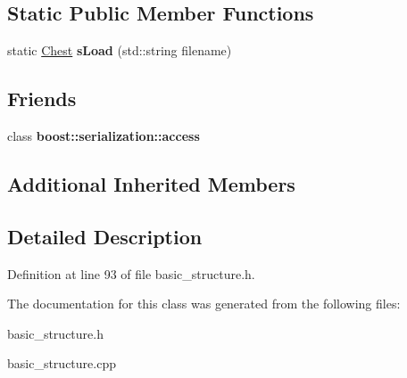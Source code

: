 \subsection*{Static Public Member Functions}
\begin{DoxyCompactItemize}
\item 
\hypertarget{class_chest_a577f83d173be0331b92093dcfb2cf4ca}{}\label{class_chest_a577f83d173be0331b92093dcfb2cf4ca} 
static \hyperlink{class_chest}{Chest} {\bfseries s\+Load} (std\+::string filename)
\end{DoxyCompactItemize}
\subsection*{Friends}
\begin{DoxyCompactItemize}
\item 
\hypertarget{class_chest_ac98d07dd8f7b70e16ccb9a01abf56b9c}{}\label{class_chest_ac98d07dd8f7b70e16ccb9a01abf56b9c} 
class {\bfseries boost\+::serialization\+::access}
\end{DoxyCompactItemize}
\subsection*{Additional Inherited Members}


\subsection{Detailed Description}


Definition at line 93 of file basic\+\_\+structure.\+h.



The documentation for this class was generated from the following files\+:\begin{DoxyCompactItemize}
\item 
basic\+\_\+structure.\+h\item 
basic\+\_\+structure.\+cpp\end{DoxyCompactItemize}
